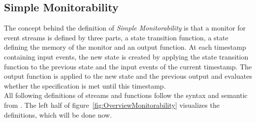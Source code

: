 	\subsection{Simple Monitorability}
		The concept behind the definition of \textit{Simple Monitorability} is that a monitor for event streams is defined by three parts, a state transition function, a state defining the memory of the monitor and an output function. At each timestamp containing input events, the new state is created by applying the state transition function to the previous state and the input events of the current timestamp. The output function is applied to the new state and the previous output and evaluates whether the specification is met until this timestamp.\\
		All following definitions of streams and functions follow the syntax and semantic from \cite{TeSSLa2}. The left half of figure~\ref{fig:OverviewMonitorability} visualizes the definitions, which will be done now.
